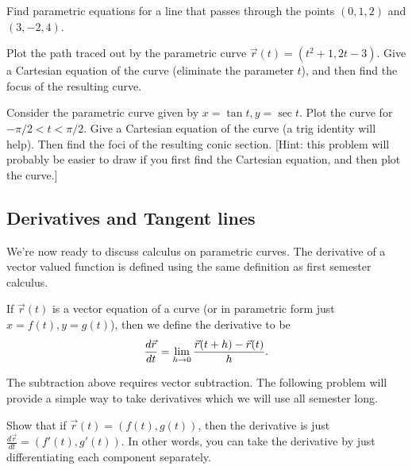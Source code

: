 \begin{problem}\label{line equation to refer to}    
Find parametric equations for a line that passes through the points $(0,1,2)$ and $(3,-2,4)$.
\end{problem}

\begin{problem}
Plot the path traced out by the parametric curve $\vec r(t)= (t^2+1, 2t-3).$ Give a Cartesian equation of the curve (eliminate the parameter $t$), and then find the focus of the resulting curve.
\end{problem}

\begin{problem}
Consider the parametric curve given by $x=\tan t, y=\sec t$. Plot the curve for $-\pi/2<t<\pi/2$. Give a Cartesian equation of the curve (a trig identity will help).  Then find the foci of the resulting conic section. [Hint: this problem will probably be easier to draw if you first find the Cartesian equation, and then plot the curve.]
\end{problem}

\subsection{Derivatives and Tangent lines}\label{derivatives and tangent lines}
We're now ready to discuss calculus on parametric curves. The derivative of a vector valued function is defined using the same definition as first semester calculus.

\begin{definition}
If $\vec r(t)$ is a vector equation of a curve (or in parametric form just $x=f(t), y=g(t)$), then we define the derivative to be $$\frac{d\vec r}{dt}=\displaystyle\lim_{h\to 0}\frac{\vec r(t+h)-\vec r(t)}{h}.$$
\end{definition}
The subtraction above requires vector subtraction.  The following problem will provide a simple way to take derivatives which we will use all semester long.

\begin{problem} 
Show that if $\vec r(t) = (f(t),g(t))$, then the derivative is just $\frac{d\vec r}{dt} = (f'(t),g'(t))$.  In other words, you can take the derivative by just differentiating each component separately.  
\end{problem}


